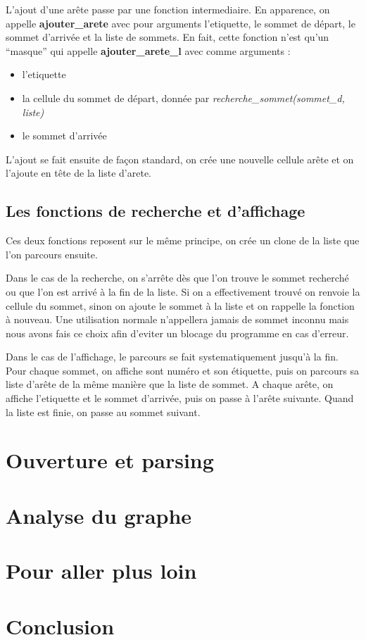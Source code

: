\documentclass[a4paper,11pt]{article}
\begin{document}
		L'ajout d'une arête passe par une fonction intermediaire. En apparence, on appelle \textbf{ajouter\_arete} avec pour arguments l'etiquette, le sommet de départ, le sommet d'arrivée et la liste de sommets. En fait, cette fonction n'est qu'un ``masque'' qui appelle \textbf{ajouter\_arete\_l} avec comme arguments : 
		\begin{itemize}
			\item l'etiquette
			\item la cellule du sommet de départ, donnée par \textit{recherche\_sommet(sommet\_d, liste)}
			\item le sommet d'arrivée
		\end{itemize}
		L'ajout se fait ensuite de façon standard, on crée une nouvelle cellule arête et on l'ajoute en tête de la liste d'arete.
	\subsection{Les fonctions de recherche et d'affichage}
		Ces deux fonctions reposent sur le même principe, on crée un clone de la liste que l'on parcours ensuite.

 Dans le cas de la recherche, on s'arrête dès que l'on trouve le sommet recherché ou que l'on est arrivé à la fin de la liste. Si on a effectivement trouvé on renvoie la cellule du sommet, sinon on ajoute le sommet à la liste et on rappelle la fonction à nouveau. Une utilisation normale n'appellera jamais de sommet inconnu mais nous avons fais ce choix afin d'eviter un blocage du programme en cas d'erreur.

	Dans le cas de l'affichage, le parcours se fait systematiquement jusqu'à la fin. Pour chaque sommet, on affiche sont numéro et son étiquette, puis on parcours sa liste d'arête de la même manière que la liste de sommet. A chaque arête, on affiche l'etiquette et le sommet d'arrivée, puis on passe à l'arête suivante. Quand la liste est finie, on passe au sommet suivant.

	\section{Ouverture et parsing}
	\section{Analyse du graphe}
	\section{Pour aller plus loin}
	\section{Conclusion}
\end{document}
